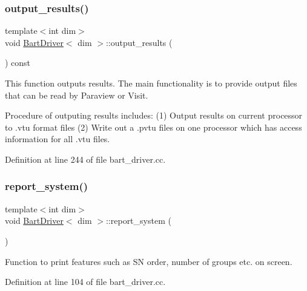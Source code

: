 \mbox{\label{class_bart_driver_a1c440c9add7a5ec9d28afb7d44fa23d9}} 
\subsubsection{\texorpdfstring{output\+\_\+results()}{output\_results()}}
{\footnotesize\ttfamily template$<$int dim$>$ \\
void \hyperlink{class_bart_driver}{Bart\+Driver}$<$ dim $>$\+::output\+\_\+results (\begin{DoxyParamCaption}{ }\end{DoxyParamCaption}) const\hspace{0.3cm}{\ttfamily [private]}}

This function outputs results. The main functionality is to provide output files that can be read by Paraview or Visit.

Procedure of outputing results includes\+: (1) Output results on current processor to .vtu format files (2) Write out a .pvtu files on one processor which has access information for all .vtu files. 

Definition at line 244 of file bart\+\_\+driver.\+cc.

\mbox{\label{class_bart_driver_aaf3b0ad2798c9add9e37ca0f649c416d}} 
\subsubsection{\texorpdfstring{report\+\_\+system()}{report\_system()}}
{\footnotesize\ttfamily template$<$int dim$>$ \\
void \hyperlink{class_bart_driver}{Bart\+Driver}$<$ dim $>$\+::report\+\_\+system (\begin{DoxyParamCaption}{ }\end{DoxyParamCaption})\hspace{0.3cm}{\ttfamily [private]}}



Function to print features such as SN order, number of groups etc. on screen. 



Definition at line 104 of file bart\+\_\+driver.\+cc.

